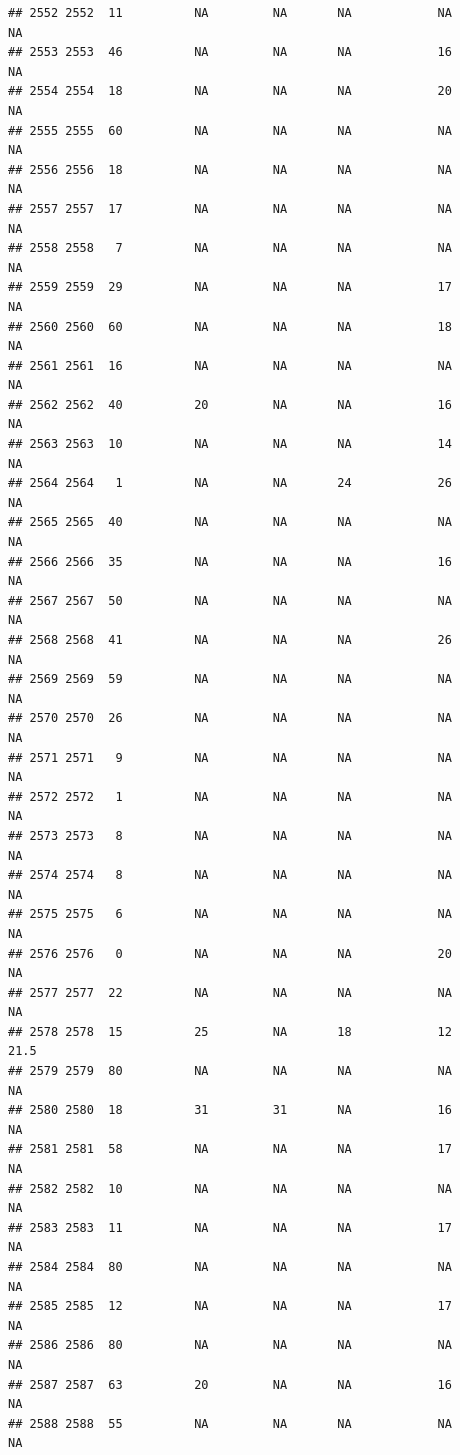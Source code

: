 \documentclass[man]{apa6}
\begin{document}
\begin{verbatim}
## 2552 2552  11          NA         NA       NA            NA       NA
## 2553 2553  46          NA         NA       NA            16       NA
## 2554 2554  18          NA         NA       NA            20       NA
## 2555 2555  60          NA         NA       NA            NA       NA
## 2556 2556  18          NA         NA       NA            NA       NA
## 2557 2557  17          NA         NA       NA            NA       NA
## 2558 2558   7          NA         NA       NA            NA       NA
## 2559 2559  29          NA         NA       NA            17       NA
## 2560 2560  60          NA         NA       NA            18       NA
## 2561 2561  16          NA         NA       NA            NA       NA
## 2562 2562  40          20         NA       NA            16       NA
## 2563 2563  10          NA         NA       NA            14       NA
## 2564 2564   1          NA         NA       24            26       NA
## 2565 2565  40          NA         NA       NA            NA       NA
## 2566 2566  35          NA         NA       NA            16       NA
## 2567 2567  50          NA         NA       NA            NA       NA
## 2568 2568  41          NA         NA       NA            26       NA
## 2569 2569  59          NA         NA       NA            NA       NA
## 2570 2570  26          NA         NA       NA            NA       NA
## 2571 2571   9          NA         NA       NA            NA       NA
## 2572 2572   1          NA         NA       NA            NA       NA
## 2573 2573   8          NA         NA       NA            NA       NA
## 2574 2574   8          NA         NA       NA            NA       NA
## 2575 2575   6          NA         NA       NA            NA       NA
## 2576 2576   0          NA         NA       NA            20       NA
## 2577 2577  22          NA         NA       NA            NA       NA
## 2578 2578  15          25         NA       18            12     21.5
## 2579 2579  80          NA         NA       NA            NA       NA
## 2580 2580  18          31         31       NA            16       NA
## 2581 2581  58          NA         NA       NA            17       NA
## 2582 2582  10          NA         NA       NA            NA       NA
## 2583 2583  11          NA         NA       NA            17       NA
## 2584 2584  80          NA         NA       NA            NA       NA
## 2585 2585  12          NA         NA       NA            17       NA
## 2586 2586  80          NA         NA       NA            NA       NA
## 2587 2587  63          20         NA       NA            16       NA
## 2588 2588  55          NA         NA       NA            NA       NA

\end{verbatim}
\end{document}
